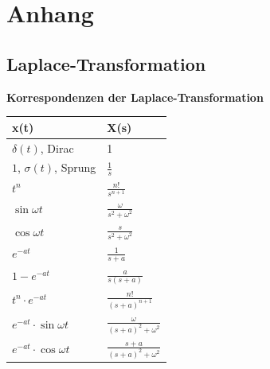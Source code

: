 \section{Anhang}

\renewcommand{\arraystretch}{1.5}
\subsection{Laplace-Transformation}
    \begin{minipage}[t]{0.48\textwidth}
        \textbf{Korrespondenzen der Laplace-Transformation}\\
        \begin{tabularx}{\textwidth}{|X|X|}
            \hline
            \textbf{x(t)} & \textbf{X(s)} \\
            \hline
            \(\delta(t)\), Dirac & 1 \\
            \hline
            \(1\), \(\sigma(t)\), Sprung & \(\frac{1}{s}\) \\
            \hline
            \(t^n\) & \(\frac{n!}{s^{n+1}}\) \\
            \hline
            \(\sin \omega t\) & \(\frac{\omega}{s^2 + \omega^2}\) \\
            \hline
            \(\cos \omega t\) & \(\frac{s}{s^2 + \omega^2}\) \\
            \hline
            \(e^{-at}\) & \(\frac{1}{s+a}\) \\
            \hline
            \(1-e^{-at}\) & \(\frac{a}{s(s+a)}\) \\
            \hline
            \(t^n \cdot e^{-at}\) & \(\frac{n!}{(s+a)^{n+1}}\) \\
            \hline
            \(e^{-at} \cdot \sin \omega t\) & \(\frac{\omega}{(s+a)^2 + \omega^2}\) \\
            \hline
            \(e^{-at} \cdot \cos \omega t\) & \(\frac{s+a}{(s+a)^2 + \omega^2}\) \\
            \hline
        \end{tabularx}
    \end{minipage}%
    \hfill

